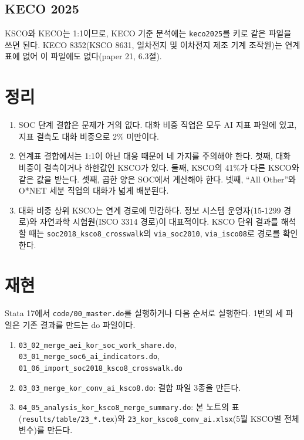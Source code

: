 \documentclass[11pt]{article}
\begin{document}
\subsection{KECO 2025}

KSCO와 KECO는 1:1이므로, KECO 기준 분석에는 \texttt{keco2025}를 키로 같은 파일을 쓰면 된다. KECO 8352(KSCO 8631, 일차전지 및 이차전지 제조 기계 조작원)는 연계표에 없어 이 파일에도 없다(paper 21, 6.3절).

\section{정리}

\begin{enumerate}[leftmargin=*]
  \item SOC 단계 결합은 문제가 거의 없다. 대화 비중 직업은 모두 AI 지표 파일에 있고, 지표 결측도 대화 비중으로 2\% 미만이다.
  \item 연계표 결합에서는 1:1이 아닌 대응 때문에 네 가지를 주의해야 한다. 첫째, 대화 비중이 결측이거나 하한값인 KSCO가 있다. 둘째, KSCO의 41\%가 다른 KSCO와 같은 값을 받는다. 셋째, 곱한 양은 SOC에서 계산해야 한다. 넷째, ``All Other''와 O*NET 세분 직업의 대화가 넓게 배분된다.
  \item 대화 비중 상위 KSCO는 연계 경로에 민감하다. 정보 시스템 운영자(15-1299 경로)와 자연과학 시험원(ISCO 3314 경로)이 대표적이다. KSCO 단위 결과를 해석할 때는 \texttt{soc2018\_ksco8\_crosswalk}의 \texttt{via\_soc2010}, \texttt{via\_isco08}로 경로를 확인한다.
\end{enumerate}

\section{재현}

Stata 17에서 \texttt{code/00\_master.do}를 실행하거나 다음 순서로 실행한다. 1번의 세 파일은 기존 결과를 만드는 do 파일이다.
\begin{enumerate}[leftmargin=*]
  \item \texttt{03\_02\_merge\_aei\_kor\_soc\_work\_share.do}, \texttt{03\_01\_merge\_soc6\_ai\_indicators.do}, \texttt{01\_06\_import\_soc2018\_ksco8\_crosswalk.do}
  \item \texttt{03\_03\_merge\_kor\_conv\_ai\_ksco8.do}: 결합 파일 3종을 만든다.
  \item \texttt{04\_05\_analysis\_kor\_ksco8\_merge\_summary.do}: 본 노트의 표(\texttt{results/table/23\_*.tex})와 \texttt{23\_kor\_ksco8\_conv\_ai.xlsx}(5월 KSCO별 전체 변수)를 만든다.
\end{enumerate}
\end{document}
